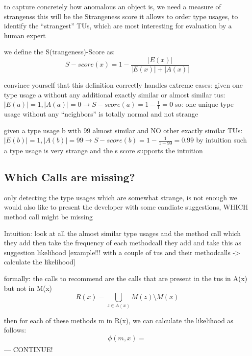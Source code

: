 to capture concretely how anomalous an object is, we need a measure of strangenss
this will be the Strangeness score
it allows to order type usages, to identify the ``strangest'' TUs, which are most interesting for evaluation by a human expert

we define the S(trangeness)-Score as:
\begin{equation*}
    S-score(x) = 1 - \frac{|E(x)|}{|E(x)|+|A(x)|}
\end{equation*}

convince yourself that this definition correctly handles extreme cases:
given one type usage a without any additional exactly similar or almost similar tus: $|E(a)| = 1, |A(a)|=0 \rightarrow S-score(a) = 1-\frac{1}{1} = 0$
so: one unique type usage without any ``neighbors'' is totally normal and not strange

given a type usage b with 99 almost similar and NO other exactly similar TUs: $|E(b)| = 1, |A(b)| = 99 \rightarrow S-score(b) = 1-\frac{1}{1+99} = 0.99$
by intuition such a type usage is very strange and the s score supports the intuition

\subsection{Which Calls are missing?}

only detecting the type usages which are somewhat strange, is not enough
we would also like to present the developer with some candiate suggestions, WHICH method call might be missing

Intuition: look at all the almost similar type usages and the method call which they add
then take the frequency of each methodcall they add and take this as suggestion likelihood
[example!!! with a couple of tus and their methodcalls -> calculate the likelihood]

formally:
the calls to recommend are the calls that are present in the tus in A(x) but not in M(x)
\begin{equation*}
    R(x) = \bigcup_{z \in A(x)} M(z) \setminus M(x)
\end{equation*}

then for each of these methods m in R(x), we can calculate the likelihood as follows:
\begin{equation*}
    \phi(m, x) = \frac{}{}
\end{equation*}
--- CONTINUE!

